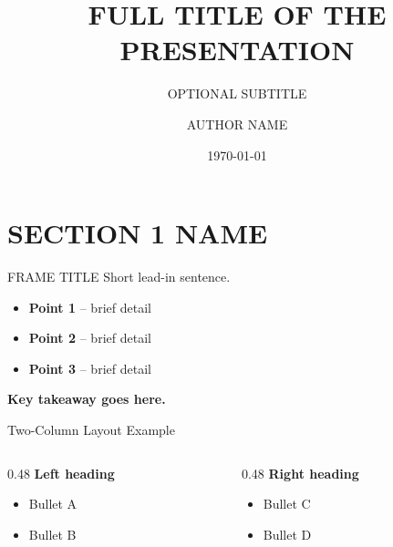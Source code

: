 \documentclass[aspectratio=169]{beamer}
\author{AUTHOR NAME}
\title[SHORT TITLE]{FULL TITLE OF THE PRESENTATION}
\subtitle{OPTIONAL SUBTITLE}
\institute{INSTITUTION OR URL}
\date{\today}
\begin{document}
\begin{frame}
    {\small \titlepage}
\end{frame}

\section{SECTION 1 NAME}

\begin{frame}{FRAME TITLE}
    Short lead-in sentence.

    \vspace{0.3cm}
    \begin{itemize}
        \item \textbf{Point 1} -- brief detail
        \item \textbf{Point 2} -- brief detail
        \item \textbf{Point 3} -- brief detail
    \end{itemize}

    \vspace{0.3cm}
    \colorbox{utu_green!20}{\parbox{0.9\textwidth}{
        \centering
        \textbf{Key takeaway goes here.}
    }}
\end{frame}

\begin{frame}{Two-Column Layout Example}
    \begin{columns}[T]
        \begin{column}{0.48\textwidth}
            \textbf{Left heading}
            \begin{itemize}
                \item Bullet A
                \item Bullet B
            \end{itemize}
        \end{column}
        \begin{column}{0.48\textwidth}
            \textbf{Right heading}
            \begin{itemize}
                \item Bullet C
                \item Bullet D
            \end{itemize}
        \end{column}
    \end{columns}
\end{frame}
\end{document}
